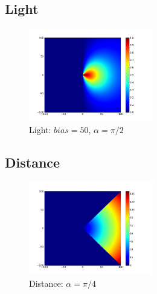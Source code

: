 \documentclass[a4paper]{article}
\begin{document}
\subsection{Light}

\begin{figure}
	\vspace{-30pt}
	\begin{center}
		\includegraphics[width=0.48\textwidth]{graphs/light.png}
	\end{center}
	\vspace{-30pt}
	\caption{Light: $bias=50$, $\alpha=\pi/2$}
\end{figure}

\subsection{Distance}
\begin{figure}
	\vspace{-30pt}
	\begin{center}
		\includegraphics[width=0.48\textwidth]{graphs/distance.png}
	\end{center}
	\vspace{-30pt}
	\caption{Distance: $\alpha=\pi/4$}
\end{figure}
\end{document}
